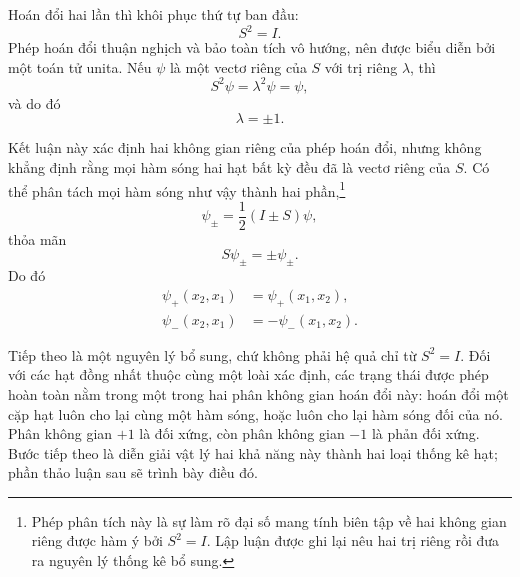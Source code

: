 Hoán đổi hai lần thì khôi phục thứ tự ban đầu:
\begin{equation}
S^{2}=I.
\end{equation}
Phép hoán đổi thuận nghịch và bảo toàn tích vô hướng, nên được biểu diễn bởi một toán tử unita. Nếu \(\psi\) là một vectơ riêng của \(S\) với trị riêng \(\lambda\), thì
\[
S^{2}\psi=\lambda^{2}\psi=\psi,
\]
và do đó
\begin{equation}
\lambda=\pm1.
\end{equation}

Kết luận này xác định hai không gian riêng của phép hoán đổi, nhưng không khẳng định rằng mọi hàm sóng hai hạt bất kỳ đều đã là vectơ riêng của \(S\). Có thể phân tách mọi hàm sóng như vậy thành hai phần,\footnote{Phép phân tích này là sự làm rõ đại số mang tính biên tập về hai không gian riêng được hàm ý bởi \(S^{2}=I\). Lập luận được ghi lại nêu hai trị riêng rồi đưa ra nguyên lý thống kê bổ sung.}\begin{equation}
\psi_{\pm}=\frac12(I\pm S)\psi,
\end{equation}
thỏa mãn
\begin{equation}
S\psi_{\pm}=\pm\psi_{\pm}.
\end{equation}
Do đó
\begin{align}
\psi_{+}(x_{2},x_{1})&=\psi_{+}(x_{1},x_{2}),\\
\psi_{-}(x_{2},x_{1})&=-\psi_{-}(x_{1},x_{2}).
\end{align}

Tiếp theo là một nguyên lý bổ sung, chứ không phải hệ quả chỉ từ \(S^{2}=I\). Đối với các hạt đồng nhất thuộc cùng một loài xác định, các trạng thái được phép hoàn toàn nằm trong một trong hai phân không gian hoán đổi này: hoán đổi một cặp hạt luôn cho lại cùng một hàm sóng, hoặc luôn cho lại hàm sóng đối của nó. Phân không gian \(+1\) là đối xứng, còn phân không gian \(-1\) là phản đối xứng. Bước tiếp theo là diễn giải vật lý hai khả năng này thành hai loại thống kê hạt; phần thảo luận sau sẽ trình bày điều đó.
